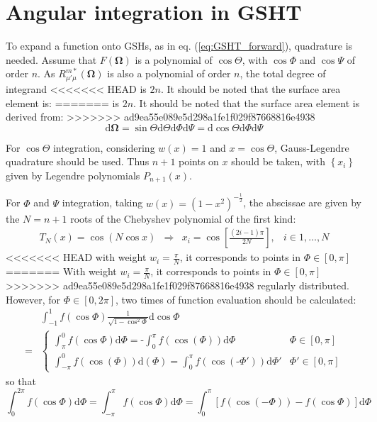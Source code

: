 \section{Angular integration in GSHT}

To expand a function onto GSHs, as in eq. (\ref{eq:GSHT_forward}),
quadrature is needed. Assume that $F(\mathbf{\Omega})$ is a polynomial
of $\cos\Theta$, with $\cos\Phi$ and $\cos\Psi$ of order $n$. As $R_{\mu'\mu}^{m*}(\mathbf{\Omega})$
is also a polynomial of order $n$, the total degree of integrand
<<<<<<< HEAD
is $2n$. It should be noted that the surface area element is:
=======
is $2n$. It should be noted that the surface area element is derived from:
>>>>>>> ad9ea55e089e5d298a1fe1f029f87668816e4938
\begin{equation}
\mathrm{d}\mathbf{\Omega}=\sin\Theta\mathrm{d}\Theta\mathrm{d}\Phi\mathrm{d}\Psi=\mathrm{d}\cos\Theta\mathrm{d}\Phi\mathrm{d}\Psi
\end{equation}


For $\cos\Theta$ integration, considering $w(x)=1$ and $x=\cos\Theta$,
Gauss-Legendre quadrature should be used. Thus $n+1$ points on $x$
should be taken, with $\left\{ x_{i}\right\} $ given by Legendre
polynomials $P_{n+1}(x).$

For $\Phi$ and $\Psi$ integration, taking $w(x)=\left(1-x^{2}\right)^{-\frac{1}{2}}$,
the abscissae are given by the $N=n+1$ roots of the Chebyshev polynomial
of the first kind:
\begin{equation}
\begin{array}{cccc}
T_{N}(x)=\cos(N\cos x) & \Rightarrow & x_{i}=\cos\left[\frac{(2i-1)\pi}{2N}\right], & i\in1,\ldots,N\end{array}
\end{equation}
<<<<<<< HEAD
with weight $w_{i}=\frac{\pi}{N}$, it corresponds to points in $\Phi\in\left[0,\pi\right]$
=======
With weight $w_{i}=\frac{\pi}{N}$, it corresponds to points in $\Phi\in\left[0,\pi\right]$
>>>>>>> ad9ea55e089e5d298a1fe1f029f87668816e4938
regularly distributed. However, for $\Phi\in\left[0,2\pi\right]$,
two times of function evaluation should be calculated:
\begin{align}
 & \int_{-1}^{1}f(\cos\Phi)\frac{1}{\sqrt{1-\cos^{2}\Phi}}\mathrm{d}\cos\Phi\nonumber \\
= & \begin{cases}
\int_{\pi}^{0}f(\cos\Phi)\mathrm{d}\Phi=\text{-}\int_{0}^{\pi}f(\cos(\Phi))\mathrm{d}\Phi & \Phi\in[0,\pi]\\
\int_{-\pi}^{0}f(\cos(\Phi))\mathrm{d}(\Phi)=\int_{0}^{\pi}f(\cos(\text{-}\Phi'))\mathrm{d}\Phi' & \Phi'\in[0,\pi]
\end{cases}
\end{align}
so that
\begin{equation}
\int_{0}^{2\pi}f(\cos\Phi)\mathrm{d}\Phi=\int_{-\pi}^{\pi}f(\cos\Phi)\mathrm{d}\Phi=\int_{0}^{\pi}\left[f(\cos(-\Phi))-f(\cos\Phi)\right]\mathrm{d}\Phi
\end{equation}


